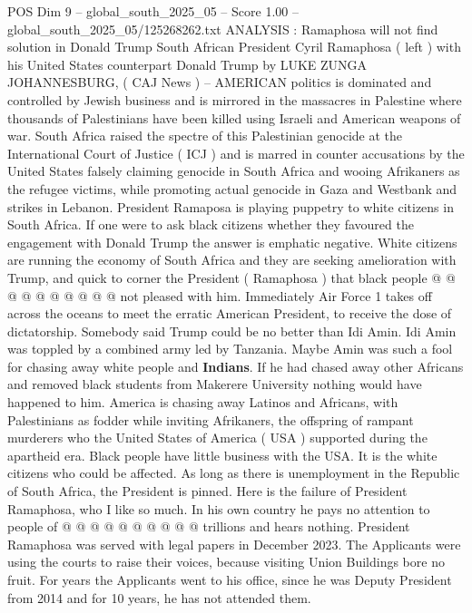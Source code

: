 \begin{textsample}{POS Dim 9 – global\_south\_2025\_05 – Score 1.00 – global\_south\_2025\_05/125268262.txt}  \label{ex:f9_pos_221}
ANALYSIS : Ramaphosa will not find solution in Donald Trump South African President Cyril Ramaphosa ( left ) with his United States counterpart Donald Trump by LUKE ZUNGA JOHANNESBURG, ( CAJ News ) -- AMERICAN politics is dominated and controlled by Jewish business and is mirrored in the massacres in Palestine where thousands of Palestinians have been killed using Israeli and American weapons of war.
South Africa raised the spectre of this Palestinian genocide at the International Court of Justice ( ICJ ) and is marred in counter accusations by the United States falsely claiming genocide in South Africa and wooing Afrikaners as the refugee victims, while promoting actual genocide in Gaza and Westbank and strikes in Lebanon.
President Ramaposa is playing puppetry to white citizens in South Africa.
If one were to ask black citizens whether they favoured the engagement with Donald Trump the answer is emphatic negative.
White citizens are running the economy of South Africa and they are seeking amelioration with Trump, and quick to corner the President ( Ramaphosa ) that black people @ @ @ @ @ @ @ @ @ @ not pleased with him.
Immediately Air Force 1 takes off across the oceans to meet the erratic American President, to receive the dose of dictatorship.
Somebody said Trump could be no better than Idi Amin.
Idi Amin was toppled by a combined army led by Tanzania.
Maybe Amin was such a fool for chasing away white people and \textbf{Indians}.
If he had chased away other Africans and removed black students from Makerere University nothing would have happened to him.
America is chasing away Latinos and Africans, with Palestinians as fodder while inviting Afrikaners, the offspring of rampant murderers who the United States of America ( USA ) supported during the apartheid era.
Black people have little business with the USA.
It is the white citizens who could be affected.
As long as there is unemployment in the Republic of South Africa, the President is pinned.
Here is the failure of President Ramaphosa, who I like so much.
In his own country he pays no attention to people of @ @ @ @ @ @ @ @ @ @ trillions and hears nothing.
President Ramaphosa was served with legal papers in December 2023.
The Applicants were using the courts to raise their voices, because visiting Union Buildings bore no fruit.
For years the Applicants went to his office, since he was Deputy President from 2014 and for 10 years, he has not attended them.

\end{textsample}
